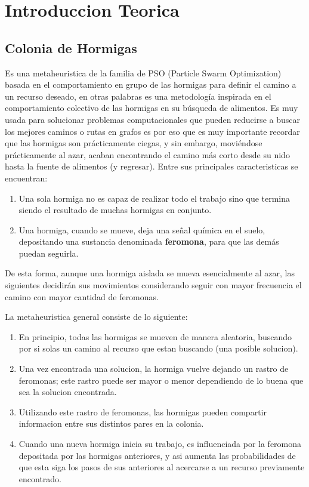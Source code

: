 \newpage
\section{Introduccion Teorica}\label{sec:introduccion}
\subsection{Colonia de Hormigas}
Es una metaheuristica de la familia de PSO (Particle Swarm Optimization) basada en el comportamiento en grupo de las hormigas para definir el camino a un recurso deseado, en otras palabras es una metodología inspirada en el comportamiento colectivo de las hormigas en su búsqueda de alimentos. 
Es muy usada para solucionar problemas computacionales que pueden reducirse a buscar los mejores caminos o rutas en grafos es por eso que es muy importante recordar que las hormigas son prácticamente ciegas, y sin embargo, moviéndose prácticamente al azar, acaban encontrando el camino más corto desde su nido hasta la fuente de alimentos (y regresar).
Entre sus principales caracteristicas se encuentran:

\begin{enumerate}
\item Una sola hormiga no es capaz de realizar todo el trabajo sino que termina siendo el resultado de muchas hormigas en conjunto.
\item Una hormiga, cuando se mueve, deja una señal química en el suelo, depositando una sustancia denominada \textbf{feromona}, para que las demás puedan seguirla.
\end{enumerate}

De esta forma, aunque una hormiga aislada se mueva esencialmente al azar, las siguientes decidirán sus movimientos considerando seguir con mayor frecuencia el camino con mayor cantidad de feromonas.

La metaheuristica general consiste de lo siguiente:
\begin{enumerate}
\item En principio, todas las hormigas se mueven de manera aleatoria, buscando por si solas un camino al recurso que estan buscando (una posible solucion).
\item Una vez encontrada una solucion, la hormiga vuelve dejando un rastro de feromonas; este rastro puede ser mayor o menor dependiendo de lo buena que sea la solucion encontrada. 
\item Utilizando este rastro de feromonas, las hormigas pueden compartir informacion entre sus distintos pares en la colonia.
\item Cuando una nueva hormiga inicia su trabajo, es influenciada por la feromona depositada por las hormigas anteriores, y asi aumenta las probabilidades de que esta siga los pasos de sus anteriores
al acercarse a un recurso previamente encontrado.
\end{enumerate}


